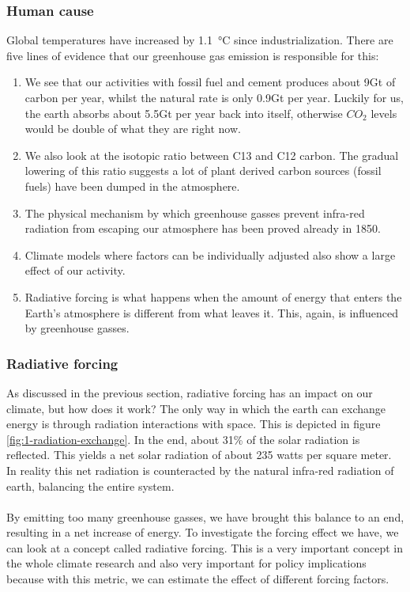 \documentclass[../summary.tex]{subfiles}
\begin{document}
			\subsubsection{Human cause}
				Global temperatures have increased by \SI{1.1}{\degreeCelsius} since industrialization. There are five lines of evidence that our greenhouse gas emission is responsible for this:
				\begin{enumerate}
					\item We see that our activities with fossil fuel and cement produces about 9Gt of carbon per year, whilst the natural rate is only 0.9Gt per year. Luckily for us, the earth absorbs about 5.5Gt per year back into itself, otherwise $CO_2$ levels would be double of what they are right now. 
					\item We also look at the isotopic ratio between C13 and C12 carbon. The gradual lowering of this ratio suggests a lot of plant derived carbon sources (fossil fuels) have been dumped in the atmosphere. 
					\item The physical mechanism by which greenhouse gasses prevent infra-red radiation from escaping our atmosphere has been proved already in 1850.
					\item Climate models where factors can be individually adjusted also show a large effect of our activity.
					\item Radiative forcing is what happens when the amount of energy that enters the Earth's atmosphere is different from what leaves it. This, again, is influenced by greenhouse gasses.
				\end{enumerate}
			
			\subsubsection{Radiative forcing}
				As discussed in the previous section, radiative forcing has an impact on our climate, but how does it work? The only way in which the earth can exchange energy is through radiation interactions with space. This is depicted in figure \ref{fig:1-radiation-exchange}. In the end, about 31\% of the solar radiation is reflected. This yields a net solar radiation of about 235 watts per square meter. In reality this net radiation is counteracted by the natural infra-red radiation of earth, balancing the entire system. 
				\\\\
				By emitting too many greenhouse gasses, we have brought this balance to an end, resulting in a net increase of energy. To investigate the forcing effect we have, we can look at a concept called radiative forcing. This is a very important concept in the whole climate research and also very important for policy implications because with this metric, we can estimate the effect of different forcing factors.\\
				
\end{document}
